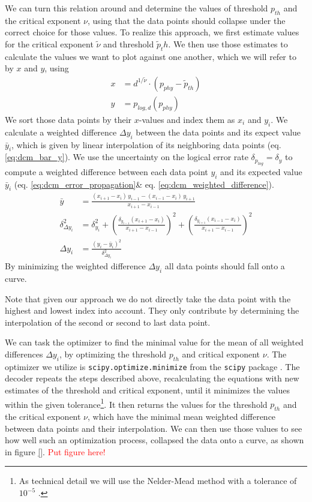 We can turn this relation around and determine the values of threshold $p_{th}$ and the critical exponent $\nu$, using that the data points should collapse under the correct choice for those values.
To realize this approach, we first estimate values for the critical exponent $\tilde{\nu}$ and threshold $\tilde{p}_th$.
We then use those estimates to calculate the values we want to plot against one another, which we will refer to by $x$ and $y$, using 
\begin{align}
    x&=d^{1/\tilde{\nu}} \cdot(p_{phy}-\tilde{p}_{th}) 
    \label{eq:data_collapse_x}
    \\
    y&=p_{log,d}(p_{phy})
\end{align}
We sort those data points by their $x$-values and index them as $x_i$ and $y_i$. 
We calculate a weighted difference $\Delta y_i$ between the data points and its expect value $\bar{y}_i$, which is given by linear interpolation of its neighboring data points (eq. \ref{eq:dcm_bar_y}).
We use the uncertainty on the logical error rate $\delta_{p_{log}}=\delta_y$ to compute a weighted difference between each data point $y_i$ and its expected value $\bar{y}_i$ (eq. \ref{eq:dcm_error_propagation}\& eq. \ref{eq:dcm_weighted_difference}). 
\begin{align}
\bar{y} &= \frac{(x_{i+1} - x_i)\,y_{i-1} - (x_{i-1} - x_i)\,y_{i+1}}{x_{i+1} - x_{i-1}} \label{eq:dcm_bar_y}\\
\delta_{\Delta y_i}^2 &= \delta_{y_i}^2 + \left(\frac{\delta_{y_{i-1}} (x_{i+1} - x_i)}{x_{i+1} - x_{i-1}}\right)^2 + \left(\frac{\delta_{y_{i+1}}(x_{i-1} - x_i)}{x_{i+1} - x_{i-1}}\right)^2 \label{eq:dcm_error_propagation} \\
\Delta y_i&= \frac{(y_i - \bar{y}_i)^2}{\delta_{\Delta y_{i}}^2} \label{eq:dcm_weighted_difference}
\end{align}
By minimizing the weighted difference $\Delta y_i$ all data points should fall onto a curve.

Note that given our approach we do not directly take the data point with the highest and lowest index into account. 
They only contribute by determining the interpolation of the second or second to last data point. 

We can task the optimizer to find the minimal value for the mean of all weighted differences $\Delta y_i$, by optimizing the threshold $p_{th}$ and critical exponent $\nu$.
The optimizer we utilize is \texttt{scipy.optimize.minimize} from the \texttt{scipy} package \cite{Scipy}.
The decoder repeats the steps described above, recalculating the equations with new estimates of the threshold and critical exponent, until it minimizes the values within the given tolerance\footnote{As technical detail we will use the Nelder-Mead method with a tolerance of $10^{-5}$ \cite{Scipy}.}.
It then returns the values for the threshold $p_{th}$ and the critical exponent $\nu$, which have the minimal mean weighted difference between data points and their interpolation. 
We can then use those values to see how well such an optimization process, collapsed the data onto a curve, as shown in figure \ref{}.
\textcolor{red}{Put figure here!}

